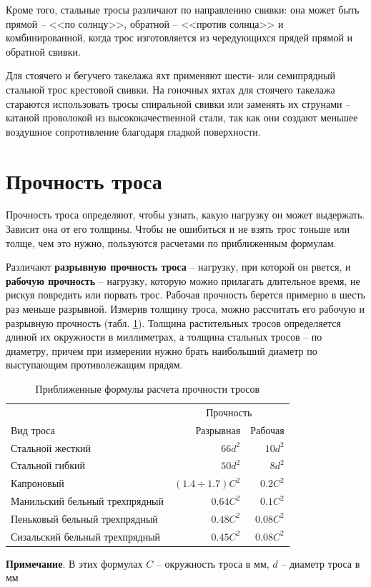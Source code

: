 \documentclass[a4paper, 12pt, twoside, final]{scrbook}
\begin{document}
Кроме того, стальные тросы различают по направлению свивки: она может быть прямой \--- <<по солнцу>>, обратной \--- <<против солнца>> и комбинированной, когда трос изготовляется из чередующихся прядей прямой и обратной свивки.

Для стоячего и бегучего такелажа яхт применяют шести- или семипрядный стальной трос крестовой свивки. На гоночных яхтах для стоячего такелажа стараются использовать тросы спиральной свивки или заменять их струнами \--- катаной проволокой из высококачественной стали, так как они создают меньшее воздушное сопротивление благодаря гладкой поверхности.

\section{Прочность троса}

Прочность троса определяют, чтобы узнать, какую нагрузку он может выдержать. Зависит она от его толщины. Чтобы не ошибиться и не взять трос тоньше или толще, чем это нужно, пользуются расчетами по приближенным формулам.

Различают \textbf{разрывную прочность троса} \--- нагрузку, при которой он рвется, и \textbf{рабочую прочность} \--- нагрузку, которую можно прилагать длительное время, не рискуя повредить или порвать трос. Рабочая прочность берется примерно в шесть раз меньше разрывной. Измерив толщину троса, можно рассчитать его рабочую и разрывную прочность (табл. \ref{tab:1}). Толщина растительных тросов определяется длиной их окружности в миллиметрах, а толщина стальных тросов \--- по диаметру, причем при измерении нужно брать наибольший диаметр по выступающим противолежащим прядям.


\begin{table}[htb]
   \centering
   \begin{tabular}{@{} lrr @{}} %
      \toprule
      & \multicolumn{2}{c}{Прочность} \\
      \cmidrule(r){2-3} %
      Вид троса & Разрывная & Рабочая \\
      \midrule
      Стальной жесткий & $66d^2$ & $10d^2$ \\
      Стальной гибкий & $50d^2$ & $8d^2$ \\
      Капроновый & $(1.4\div1.7)C^2$ & $0.2C^2$ \\
      Манильский бельный трехпрядный & $0.64C^2$ & $0.1C^2$ \\
      Пеньковый бельный трехпрядный & $0.48C^2$ & $0.08C^2$ \\
      Сизальский бельный трехпрядный & $0.45C^2$ & $0.08C^2$ \\ 
      \bottomrule
   \end{tabular}
   \caption{Приближенные формулы расчета прочности тросов}
   \label{tab:1}
   \small
   \textbf{Примечание}. В этих формулах $C$ \--- окружность троса в мм, $d$ \--- диаметр троса в мм
\end{table}
\end{document}
